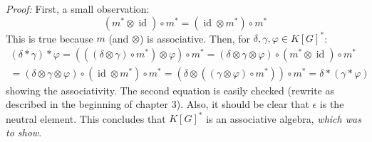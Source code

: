 \message{ !name(roughdraft.tex)}\documentclass{article}
\theoremstyle{prrt}
\begin{document}
\textit{Proof:} First, a small observation:
\begin{equation}
  \left(m^\ast \otimes \operatorname{id} \right) \circ m^\ast = \left( \operatorname{id} \otimes m^\ast \right) \circ m^\ast
\end{equation}
This is true because $m$ (and $ \otimes $) is associative.
Then, for $\delta, \gamma, \varphi \in K \left\lbrack G \right\rbrack^\ast$:
\begin{equation}
  \begin{aligned}
  \left( \delta \ast \gamma \right) \ast \varphi
  = \left( \left( \left( \delta \otimes \gamma \right) \circ m^\ast \right) \otimes \varphi \right) \circ m^\ast
  = \left( \delta \otimes \gamma \otimes \varphi \right) \circ \left( m^\ast \otimes \operatorname{id} \right) \circ m^\ast \\
  = \left( \delta \otimes \gamma \otimes \varphi \right) \circ \left( \operatorname{id} \otimes m^\ast \right) \circ m^\ast
  = \left( \delta \otimes \left( \left( \gamma \otimes \varphi \right) \circ m^\ast \right) \right) \circ m^\ast
  = \delta \ast \left( \gamma \ast \varphi \right)
  \end{aligned}
\end{equation}
showing the associativity.
The second equation is easily checked (rewrite as described in the beginning of chapter 3).
Also, it should be clear that $\epsilon$ is the neutral element.
This concludes that $K \left\lbrack G \right\rbrack^\ast$ is an associative algebra, \textit{which was to show}.
\end{document}
